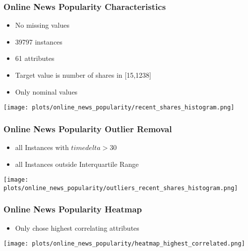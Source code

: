 \documentclass[aspectratio=169]{beamer}
\begin{document}
\begin{frame}{}
\frametitle{Online News Popularity Characteristics}
\begin{minipage}{0.3\textwidth}
\begin{itemize}
\item No missing values
\item 39797 instances
\item 61 attributes
\item Target value is number of shares in [15,1238]
\item Only nominal values
\end{itemize}
\end{minipage}
\begin{minipage}{0.69\textwidth}
    \texttt{[image: plots/online\_news\_popularity/recent\_shares\_histogram.png]}
\end{minipage}
\end{frame}

\begin{frame}{}
\frametitle{Online News Popularity Outlier Removal}
\begin{minipage}{0.3\textwidth}
\begin{itemize}
\item all Instances with $timedelta>30$
\item all Instances outside Interquartile Range
\end{itemize}
\end{minipage}
\begin{minipage}{0.69\textwidth}
    \texttt{[image: plots/online\_news\_popularity/outliers\_recent\_shares\_histogram.png]}
\end{minipage}
\end{frame}

\begin{frame}{}
\frametitle{Online News Popularity Heatmap}
\begin{minipage}{0.3\textwidth}
\begin{itemize}
\item Only chose highest correlating attributes
\end{itemize}
\end{minipage}
\begin{minipage}{0.69\textwidth}
    \texttt{[image: plots/online\_news\_popularity/heatmap\_highest\_correlated.png]}
\end{minipage}
\end{frame}
\end{document}
